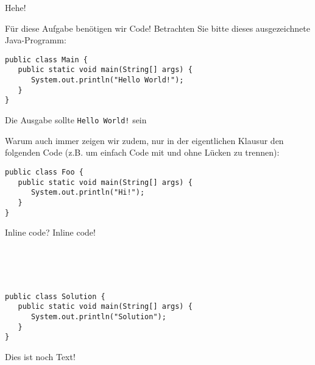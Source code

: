 \begin{task}[5]{Hehe!}
\label{ex:second}%

Für diese Aufgabe benötigen wir Code!
Betrachten Sie bitte dieses ausgezeichnete Java-Programm:

\begin{verbatim}
public class Main {
   public static void main(String[] args) {
      System.out.println("Hello World!");
   }
}
\end{verbatim}
\begin{examples}[Hier ein \ifnum\examplescount=1 Beispiel\else paar Beispiele\fi:]
   \item Die Ausgabe sollte \texttt{Hello World!} sein
\end{examples}

\ifexam
Warum auch immer zeigen wir zudem, nur in der eigentlichen Klausur den folgenden Code (z.B. um einfach Code mit und ohne Lücken zu trennen):

\begin{verbatim}
public class Foo {
   public static void main(String[] args) {
      System.out.println("Hi!");
   }
}
\end{verbatim}
\bigskip

\IndentGuides{9cm}

\IndentGuidesDistance{0.5cm}
\IndentGuides[4]{5cm}

\fi


Inline code? Inline code!

\\
\\
\\

\begin{solution}\begin{verbatim}
public class Solution {
   public static void main(String[] args) {
      System.out.println("Solution");
   }
}
\end{verbatim}
Dies ist noch Text!\end{solution}


\end{task}
